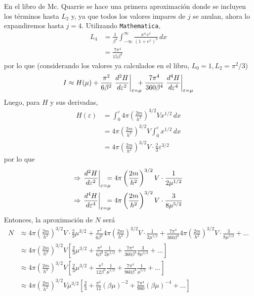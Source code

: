 \documentclass[]{article}
\numberwithin{equation}{section}
\newcommand{\0}{\textcolor{gray}{0}}
\newcommand{\td}[2]{\dfrac{d #1}{d #2}}
\begin{document}
En el libro de Mc. Quarrie se hace una primera aproximación donde se incluyen los términos hasta $L_2$ y, ya que todos los valores impares de $j$ se anulan, ahora lo expandiremos hasta $j=4$. Utilizando \texttt{Mathematica},
\begin{align*}
	L_4 &= \frac{1}{\beta^4}\int_{-\infty}^{\infty} \frac{x^4\, e^x}{(1+e^x)^2} \, dx\\
	&= \frac{7 \pi^4}{15 \beta^4}
\end{align*}
por lo que (considerando los valores ya calculados en el libro, $L_0 = 1, L_2 = \pi^2/3$)
\begin{equation}
	I \approx H(\mu) + \frac{\pi^2}{6 \beta^2} \left. \td{^2 H}{\varepsilon^2}\right|_{\varepsilon=\mu} \hspace{-3mm} + \frac{7 \pi^4}{360 \beta^4} \left. \td{^4 H}{\varepsilon^4}\right|_{\varepsilon=\mu}
\end{equation}
Luego, para $H$ y sus derivadas,
\begin{align*}
	H(\varepsilon) &= \int_{0}^{\varepsilon} 4 \pi\left(\frac{2 m}{h^2}\right)^{3 / 2} V x^{1 / 2} \, dx\\
	&= 4 \pi\left(\frac{2 m}{h^2}\right)^{3 / 2} V \int_{0}^{\varepsilon}  x^{1 / 2} \, dx\\
	&= 4 \pi\left(\frac{2 m}{h^2}\right)^{3 / 2} V \cdot \frac{2}{3} \varepsilon^{3/2}
\end{align*}
por lo que
\begin{align*}
	\Rightarrow \left. \td{^2 H}{\varepsilon^2}\right|_{\varepsilon=\mu} \hspace{-3mm} &= 4 \pi\left(\frac{2 m}{h^2}\right)^{3 / 2} V \cdot \frac{1}{2\mu^{1/2}}\\
	\Rightarrow \left. \td{^4 H}{\varepsilon^4}\right|_{\varepsilon=\mu} \hspace{-3mm} &= 4 \pi\left(\frac{2 m}{h^2}\right)^{3 / 2} V \cdot \frac{3}{8 \mu^{5/2}}
\end{align*}
Entonces, la aproximación de $N$ será
\begin{align}
	N &\approx 4 \pi\left(\frac{2 m}{h^2}\right)^{3 / 2} V \cdot \frac{2}{3} \mu^{3/2} + \frac{\pi^2}{6 \beta^2} 4 \pi\left(\frac{2 m}{h^2}\right)^{3 / 2} V \cdot \frac{1}{2\mu^{1/2}} + \frac{7 \pi^4}{360 \beta^4} 4 \pi\left(\frac{2 m}{h^2}\right)^{3 / 2} V \cdot \frac{3}{8 \mu^{5/2}} + \ldots \nonumber\\
	&\approx 4 \pi\left(\frac{2 m}{h^2}\right)^{3 / 2} V \left[\frac{2}{3} \mu^{3/2} + \frac{\pi^2}{6 \beta^2} \frac{1}{2\mu^{1/2}} + \frac{7 \pi^4}{360 \beta^4} \frac{3}{8 \mu^{5/2}} + \ldots \right]  \nonumber\\
	&\approx 4 \pi\left(\frac{2 m}{h^2}\right)^{3 / 2} V \left[\frac{2}{3} \mu^{3/2} + \frac{\pi^2}{12 \beta^2} \frac{1}{\mu^{1/2}} + \frac{7 \pi^4}{960 \beta^4} \frac{1}{\mu^{5/2}} + \ldots \right] \nonumber\\
	&\approx 4 \pi\left(\frac{2 m}{h^2}\right)^{3 / 2} V \mu^{3/2} \left[\frac{2}{3} + \frac{\pi^2}{12} (\beta \mu)^{-2} + \frac{7 \pi^4}{960} (\beta \mu)^{-4} + \ldots \right]
\end{align}
\end{document}
